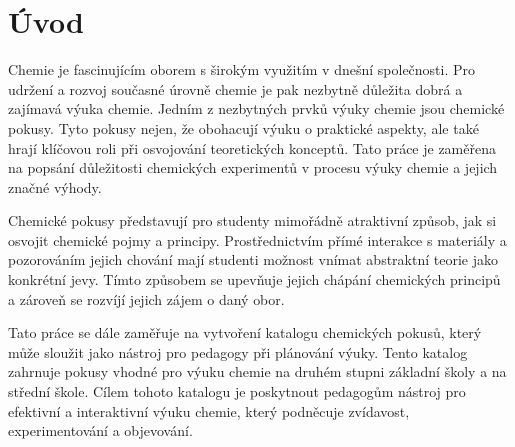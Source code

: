 \chapter*{Úvod}

Chemie je fascinujícím oborem s širokým využitím v dnešní společnosti. Pro udržení a rozvoj současné úrovně chemie je pak nezbytně důležita dobrá a zajímavá výuka chemie. Jedním z nezbytných prvků výuky chemie jsou chemické pokusy. Tyto pokusy nejen, že obohacují výuku o praktické aspekty, ale také hrají klíčovou roli při osvojování teoretických konceptů. Tato práce je zaměřena na popsání důležitosti chemických experimentů v procesu výuky chemie a jejich značné výhody.

Chemické pokusy představují pro studenty mimořádně atraktivní způsob, jak si osvojit chemické pojmy a principy. Prostřednictvím přímé interakce s materiály a pozorováním jejich chování mají studenti možnost vnímat abstraktní teorie jako konkrétní jevy. Tímto způsobem se upevňuje jejich chápání chemických principů a zároveň se rozvíjí jejich zájem o daný obor.

Tato práce se dále zaměřuje na vytvoření katalogu chemických pokusů, který může sloužit jako nástroj pro pedagogy při plánování výuky. Tento katalog zahrnuje pokusy vhodné pro výuku chemie na druhém stupni základní školy a na střední škole. Cílem tohoto katalogu je poskytnout pedagogům nástroj pro efektivní a interaktivní výuku chemie, který podněcuje zvídavost, experimentování a objevování.
\newpage

